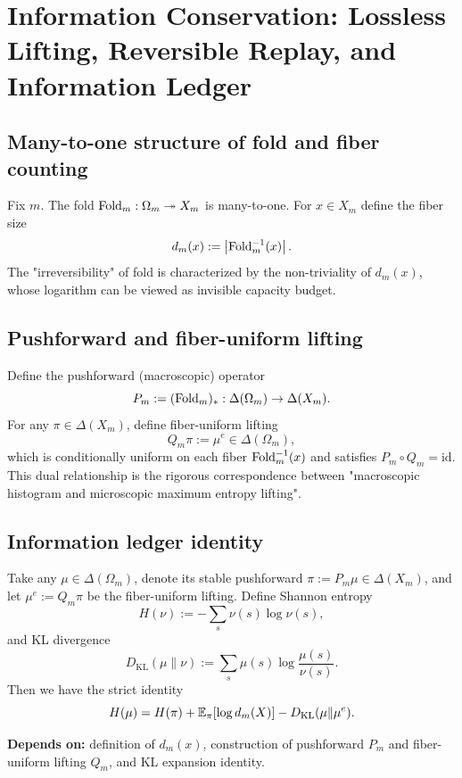 \section{Information Conservation: Lossless Lifting, Reversible Replay, and Information Ledger}\label{sec:ledger}

\subsection{Many-to-one structure of fold and fiber counting}
Fix $m$. The fold $\mathrm{Fold}_m:\Omega_m\twoheadrightarrow X_m$ is many-to-one. For $x\in X_m$ define the fiber size
$$
d_m(x):=\left\lvert \mathrm{Fold}_m^{-1}(x)\right\rvert.
$$
The "irreversibility" of fold is characterized by the non-triviality of $d_m(x)$, whose logarithm can be viewed as invisible capacity budget.\par

\subsection{Pushforward and fiber-uniform lifting}
Define the pushforward (macroscopic) operator
$$
P_m := (\mathrm{Fold}_m)_*:\Delta(\Omega_m)\to \Delta(X_m).
$$
For any $\pi\in\Delta(X_m)$, define fiber-uniform lifting
$$
Q_m\pi := \mu^e\in\Delta(\Omega_m),
$$
which is conditionally uniform on each fiber $\mathrm{Fold}_m^{-1}(x)$ and satisfies $P_m\circ Q_m=\mathrm{id}$. This dual relationship is the rigorous correspondence between "macroscopic histogram and microscopic maximum entropy lifting".\par

\subsection{Information ledger identity}
\begin{theorem}\label{thm:ledger-identity}
Take any $\mu\in\Delta(\Omega_m)$, denote its stable pushforward $\pi:=P_m\mu \in \Delta(X_m)$, and let $\mu^e:=Q_m\pi$ be the fiber-uniform lifting. Define Shannon entropy
$$
H(\nu):=-\sum_{s} \nu(s)\log \nu(s),
$$
and KL divergence
$$
D_{\mathrm{KL}}(\mu\|\nu):=\sum_{s} \mu(s)\log\frac{\mu(s)}{\nu(s)}.
$$
Then we have the strict identity
$$
H(\mu)=H(\pi)+\mathbb{E}_{\pi}[\log d_m(X)]-D_{\mathrm{KL}}(\mu\|\mu^e).
$$
\par\noindent\textnormal{\textbf{Depends on:} definition of $d_m(x)$, construction of pushforward $P_m$ and fiber-uniform lifting $Q_m$, and KL expansion identity.}\par
\end{theorem}

